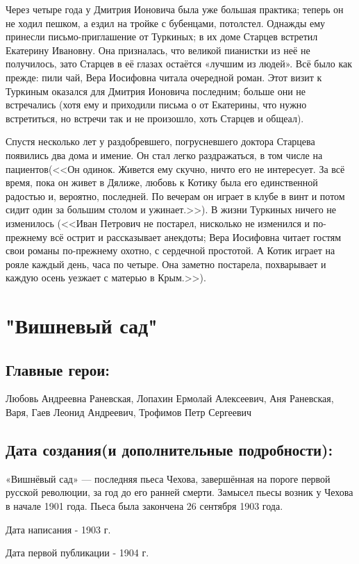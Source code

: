 \documentclass[a4paper,12pt]{article}
\begin{document}
	Через четыре года у Дмитрия Ионовича была уже большая практика; теперь он не ходил пешком, а ездил на тройке с бубенцами, потолстел. Однажды ему принесли письмо-приглашение от Туркиных; в их доме Старцев встретил Екатерину Ивановну. Она призналась, что великой пианистки из неё не получилось, зато Старцев в её глазах остаётся «лучшим из людей». Всё было как прежде: пили чай, Вера Иосифовна читала очередной роман. Этот визит к Туркиным оказался для Дмитрия Ионовича последним; больше они не встречались (хотя ему и приходили письма о от Екатерины, что нужно встретиться, но встречи так и не произошло, хоть Старцев и общеал).
	
	Спустя несколько лет у раздобревшего, погрусневшего доктора Старцева появились два дома и имение. Он стал легко раздражаться, в том числе на пациентов(<<Он одинок. Живется ему скучно, ничто его не интересует. За всё время, пока он живет в Дялиже, любовь к Котику была его единственной радостью и, вероятно, последней. По вечерам он играет в клубе в винт и потом сидит один за большим столом и ужинает.>>). В жизни Туркиных ничего не изменилось (<<Иван Петрович не постарел, нисколько не изменился и по-прежнему всё острит и рассказывает анекдоты; Вера Иосифовна читает гостям свои романы по-прежнему охотно, с сердечной простотой. А Котик играет на рояле каждый день, часа по четыре. Она заметно постарела, похварывает и каждую осень уезжает с матерью в Крым.>>). 
	
	\section{"Вишневый сад"}
	\subsection{Главные герои: }
	Любовь Андреевна Раневская, Лопахин Ермолай Алексеевич, Аня Раневская, Варя, Гаев Леонид Андреевич, Трофимов Петр Сергеевич
	\subsection{Дата создания(и дополнительные подробности): }
	«Вишнёвый сад» — последняя пьеса Чехова, завершённая на пороге первой русской революции, за год до его ранней смерти. Замысел пьесы возник у Чехова в начале 1901 года. Пьеса была закончена 26 сентября 1903 года.
	
	\noindent
	Дата написания - 1903 г.
	
	\noindent
	Дата первой публикации - 1904 г.
	
\end{document}
